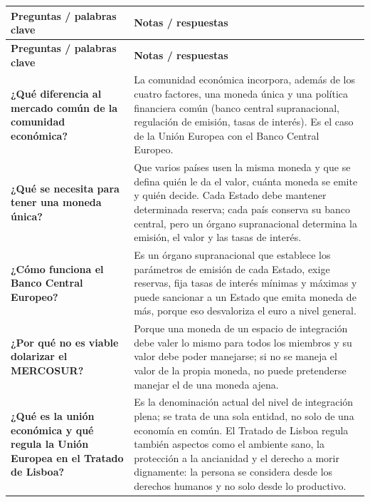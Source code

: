 \documentclass[12pt,oneside]{book}
\begin{document}
\begin{longtable}{>{\raggedright\arraybackslash}p{} >{\raggedright\arraybackslash}p{}}
\toprule
\textbf{Preguntas / palabras clave} & \textbf{Notas / respuestas} \\
\midrule
\endfirsthead
\toprule
\textbf{Preguntas / palabras clave} & \textbf{Notas / respuestas} \\
\midrule
\endhead
\bottomrule
\endfoot

\textbf{¿Qué diferencia al mercado común de la comunidad económica?} &
La comunidad económica incorpora, además de los cuatro factores, una moneda única y una política financiera común (banco central supranacional, regulación de emisión, tasas de interés). Es el caso de la Unión Europea con el Banco Central Europeo. \\[0.8em]

\textbf{¿Qué se necesita para tener una moneda única?} &
Que varios países usen la misma moneda y que se defina quién le da el valor, cuánta moneda se emite y quién decide. Cada Estado debe mantener determinada reserva; cada país conserva su banco central, pero un órgano supranacional determina la emisión, el valor y las tasas de interés. \\[0.8em]

\textbf{¿Cómo funciona el Banco Central Europeo?} &
Es un órgano supranacional que establece los parámetros de emisión de cada Estado, exige reservas, fija tasas de interés mínimas y máximas y puede sancionar a un Estado que emita moneda de más, porque eso desvaloriza el euro a nivel general. \\[0.8em]

\textbf{¿Por qué no es viable dolarizar el MERCOSUR?} &
Porque una moneda de un espacio de integración debe valer lo mismo para todos los miembros y su valor debe poder manejarse; si no se maneja el valor de la propia moneda, no puede pretenderse manejar el de una moneda ajena. \\[0.8em]

\textbf{¿Qué es la unión económica y qué regula la Unión Europea en el Tratado de Lisboa?} &
Es la denominación actual del nivel de integración plena; se trata de una sola entidad, no solo de una economía en común. El Tratado de Lisboa regula también aspectos como el ambiente sano, la protección a la ancianidad y el derecho a morir dignamente: la persona se considera desde los derechos humanos y no solo desde lo productivo. \\[0.8em]


\end{longtable}
\end{document}
